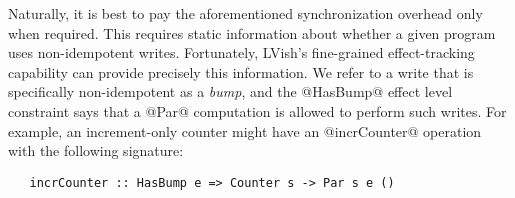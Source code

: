 Naturally, it is best to pay the aforementioned synchronization
overhead only when required.  This requires static information about
whether a given program uses non-idempotent writes.  Fortunately,
LVish's fine-grained effect-tracking capability can provide precisely
this information.  We refer to a write that is specifically
non-idempotent as a \emph{bump}, and the @HasBump@ effect level
constraint says that a @Par@ computation is allowed to perform such
writes.  For example, an increment-only counter might have an
@incrCounter@ operation with the following signature:

\singlespacing
\begin{lstlisting}
   incrCounter :: HasBump e => Counter s -> Par s e ()
\end{lstlisting}
\doublespacing


